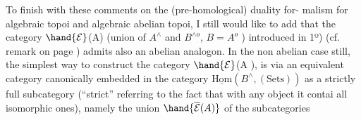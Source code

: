  To finish with these comments on the (pre-homological) duality for-%
malism for algebraic topoi and algebraic abelian topoi, I still would
like to add that the category $\hand{\mathcal{E}}$(A) (union of $A^{\wedge}$ and $B^{\wedge o}$,  $B=A^{o}$ )
introduced in 1º) (cf. remark on page ) admits also an abelian
analogon. In the non abelian case still, the simplest way to construct
the category $\hand{\mathcal{E}}$(A ), is via an equivalent category canonically embedded
in the category $\underline{\text{Hom}}(B^{\wedge}, (\text{Sets}))$ as a strictly full subcategory
(``strict'' referring to the fact that  with any object it contai
all isomorphic ones), namely the union $\hand{\overline{\mathcal{E}}(A)}$ of the  subcategories

